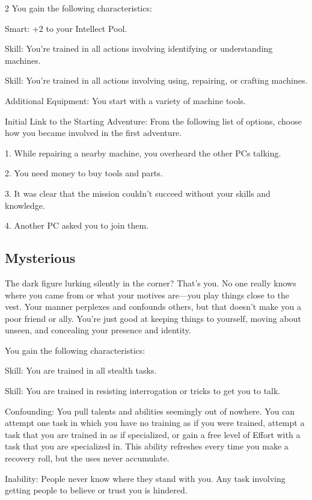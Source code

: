 \begin{multicols}{2}
You gain the following characteristics:

Smart: +2 to your Intellect Pool. 

Skill: You’re trained in all actions involving identifying or understanding machines.

Skill: You’re trained in all actions involving using, repairing, or crafting machines.

Additional Equipment: You start with a variety of machine tools.

Initial Link to the Starting Adventure: From the following list of options, choose how you became involved in the first adventure.

1. While repairing a nearby machine, you overheard the other PCs talking.

2. You need money to buy tools and parts.

3. It was clear that the mission couldn’t succeed without your skills and knowledge.

4. Another PC asked you to join them.

\subsection{Mysterious}

The dark figure lurking silently in the corner? That’s you. No one really knows where you came from or what your motives are—you play things close to the vest. Your manner perplexes and confounds others, but that doesn’t make you a poor friend or ally. You’re just good at keeping things to yourself, moving about unseen, and concealing your presence and identity.

You gain the following characteristics:

Skill: You are trained in all stealth tasks.

Skill: You are trained in resisting interrogation or tricks to get you to talk.

Confounding: You pull talents and abilities seemingly out of nowhere. You can attempt one task in which you have no training as if you were trained, attempt a task that you are trained in as if specialized, or gain a free level of Effort with a task that you are specialized in. This ability refreshes every time you make a recovery roll, but the uses never accumulate.

Inability: People never know where they stand with you. Any task involving getting people to believe or trust you is hindered.


\end{multicols}
